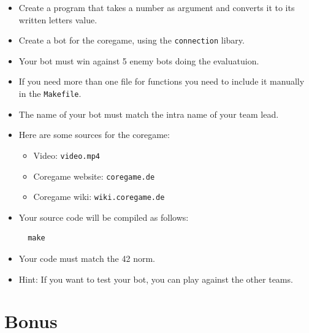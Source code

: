 \documentclass[12pt]{article}
\begin{document}
\begin{itemize}
  \item Create a program that takes a number as argument and converts it to its written letters value.
  
  \item Create a bot for the coregame, using the \texttt{connection} libary.
  
  \item Your bot must win against 5 enemy bots doing the evaluatuion.
  
  \item If you need more than one file for functions you need to include it manually in the \texttt{Makefile}.
  
  \item The name of your bot must match the intra name of your team lead.
  
  \item Here are some sources for the coregame:
  \begin{itemize}
    \item Video: \texttt{video.mp4}
    \item Coregame website: \texttt{coregame.de}
    \item Coregame wiki: \texttt{wiki.coregame.de}
  \end{itemize}
  
  \item Your source code will be compiled as follows:
  
  \begin{verbatim}
  make
  \end{verbatim}
  
  \item Your code must match the 42 norm.
  
  \item Hint: If you want to test your bot, you can play against the other teams.
\end{itemize}

\newpage

\section{Bonus}
\end{document}
